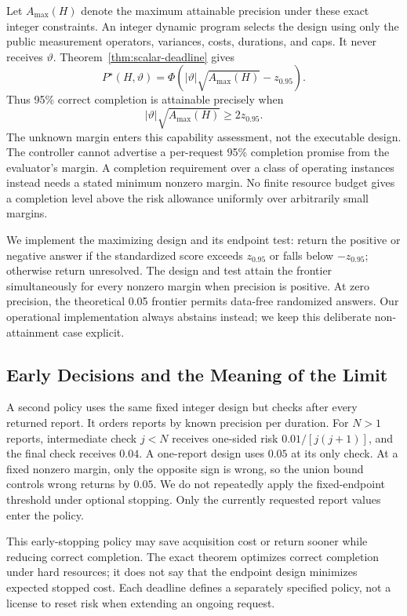 Let $A_{\max}(H)$ denote the maximum attainable precision under these exact
integer constraints. An integer dynamic program selects the design using
only the public measurement operators, variances, costs, durations, and caps.
It never receives $\vartheta$. Theorem~\ref{thm:scalar-deadline} gives
$$
P^\star(H,\vartheta)
 =\Phi\!\left(|\vartheta|\sqrt{A_{\max}(H)}-z_{0.95}\right).
$$
Thus 95\% correct completion is attainable precisely when
$$
|\vartheta|\sqrt{A_{\max}(H)}\geq2z_{0.95}.
$$
The unknown margin enters this capability assessment, not the executable
design. The controller cannot advertise a per-request 95\% completion
promise from the evaluator's margin. A completion requirement over a class
of operating instances instead needs a stated minimum nonzero margin. No finite resource
budget gives a completion level above the risk allowance uniformly over
arbitrarily small margins.

We implement the maximizing design and its endpoint test: return the
positive or negative answer if the standardized score exceeds $z_{0.95}$
or falls below $-z_{0.95}$; otherwise return unresolved. The design and test
attain the frontier simultaneously for every nonzero margin when precision
is positive. At zero precision, the theoretical 0.05 frontier permits
data-free randomized answers. Our operational implementation always
abstains instead; we keep this deliberate non-attainment case explicit.

\subsection{Early Decisions and the Meaning of the Limit}

A second policy uses the same fixed integer design but checks after every
returned report. It orders reports by known precision per duration. For
$N>1$ reports, intermediate check $j<N$ receives one-sided risk
$0.01/[j(j+1)]$, and the final check receives $0.04$. A one-report design
uses $0.05$ at its only check. At a fixed nonzero margin, only the opposite
sign is wrong, so the union bound controls wrong returns by $0.05$.
We do not repeatedly apply the fixed-endpoint threshold under optional
stopping. Only the currently requested report values enter the policy.

This early-stopping policy may save acquisition cost or return sooner while
reducing correct completion. The exact theorem optimizes correct completion
under hard resources; it does not say that the endpoint design minimizes
expected stopped cost. Each deadline defines a separately specified policy,
not a license to reset risk when extending an ongoing request.

